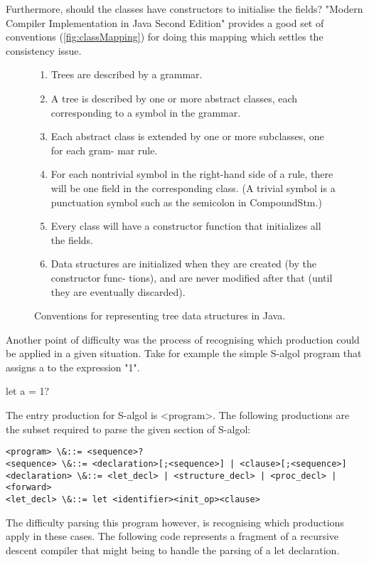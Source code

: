 \documentclass{article}
\begin{document}
Furthermore, should the classes have constructors to initialise the fields? "Modern Compiler Implementation in Java Second Edition" provides a good set of conventions (\ref{fig:classMapping}) for doing this mapping which settles the consistency issue. 


\begin{figure}
\begin{enumerate}
\item Trees are described by a grammar.
\item A tree is described by one or more abstract classes, each corresponding to a
symbol in the grammar.
\item Each abstract class is extended by one or more subclasses, one for each gram-
mar rule.
\item For each nontrivial symbol in the right-hand side of a rule, there will be one field in the corresponding class. (A trivial symbol is a punctuation symbol such as the semicolon in CompoundStm.)
\item Every class will have a constructor function that initializes all the fields.
\item Data structures are initialized when they are created (by the constructor func-
tions), and are never modified after that (until they are eventually discarded).
\end{enumerate}
\caption{Conventions for representing tree data structures in Java. \cite{11270520020101}}
\label{classMapping}
\end{figure}

Another point of difficulty was the process of recognising which production could be applied in a given situation. Take for example the simple S-algol program that assigns a to the expression "1".

let a = 1?

The entry production for S-algol is <program>. The following productions are the subset required to parse the given section of S-algol:

\begin{lstlisting}[caption={TODO},label={lst:fixedclauseprod}]
<program> \&::= <sequence>?
<sequence> \&::= <declaration>[;<sequence>] | <clause>[;<sequence>]
<declaration> \&::= <let_decl> | <structure_decl> | <proc_decl> | <forward>
<let_decl> \&::= let <identifier><init_op><clause>
\end{lstlisting}

The difficulty parsing this program however, is recognising which productions apply in these cases. The following code represents a fragment of a recursive descent compiler that might being to handle the parsing of a let declaration.
\end{document}
